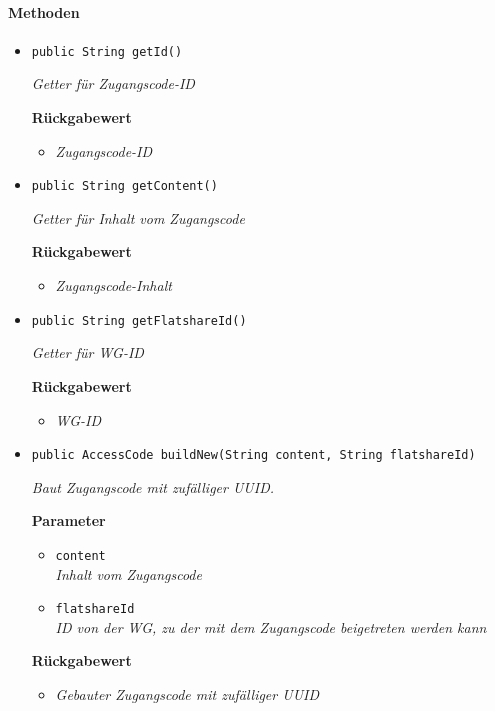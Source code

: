      \paragraph*{Methoden}
     \begin{itemize}
     	\item{\texttt{public String getId()}}
     	
     	\textit{Getter für Zugangscode-ID}
     	
     	\textbf{Rückgabewert}
     	\begin{itemize}
     		\item\textit{Zugangscode-ID}
     	\end{itemize}
     
     \item{\texttt{public String getContent()}}
     	
     	\textit{Getter für Inhalt vom Zugangscode}
     	
     	\textbf{Rückgabewert}
     	\begin{itemize}
     		\item\textit{Zugangscode-Inhalt}
     	\end{itemize}
     
     \item{\texttt{public String getFlatshareId()}}
     	
     	\textit{Getter für WG-ID}
     	
     	\textbf{Rückgabewert}
     	\begin{itemize}
     		\item\textit{WG-ID}
     	\end{itemize}
     
     \item{\texttt{public AccessCode buildNew(String content, String flatshareId)}}
     	
     	\textit{Baut Zugangscode mit zufälliger UUID.}
     	
     	\textbf{Parameter}
     	\begin{itemize}
     		\item\texttt{content}\\
     		\textit{Inhalt vom Zugangscode} 
     		\item\texttt{flatshareId}\\
     		\textit{ID von der WG, zu der mit dem Zugangscode beigetreten werden kann} 
     	\end{itemize}
     	
     	\textbf{Rückgabewert}
     	\begin{itemize}
     		\item\textit{Gebauter Zugangscode mit zufälliger UUID}
     	\end{itemize}
     \end{itemize}
 
